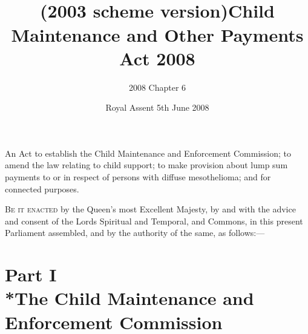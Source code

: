 \documentclass[12pt,a4paper]{article}
\title{\regstitle\\(2003 scheme version)}
\title{Child Maintenance and Other Payments Act 2008%
}
\author{2008 Chapter 6}
\date{Royal Assent
5th June 2008\\
}
\begin{document}
\maketitle

\noindent
{\large An Act to establish the Child Maintenance and Enforcement Commission; to amend the law relating to child support; to make provision about lump sum payments to or in respect of persons with diffuse mesothelioma; and for connected purposes.}

\bigskip

\lettrine{B}{e it enacted} by the Queen’s most Excellent Majesty, by and with the advice and consent of the Lords Spiritual and Temporal, and Commons, in this present Parliament assembled, and by the authority of the same, as follows:—


{\sloppy

\tableofcontents

}

\setcounter{secnumdepth}{-2}

\part[Part I --- The Child Maintenance and Enforcement Commission]{Part I\\*The Child Maintenance and Enforcement Commission}

\renewcommand\parthead{--- Part I}

\end{document}
